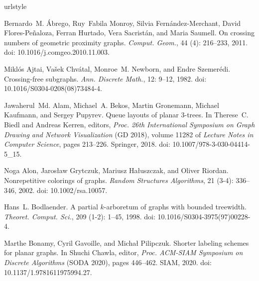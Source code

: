 \documentclass{patmorin}
\begin{document}
\begin{thebibliography}{37}
	\providecommand{\natexlab}[1]{#1}
	\providecommand{\url}[1]{\texttt{#1}}
	\expandafter\ifx\csname urlstyle\endcsname\relax
	\providecommand{\doi}[1]{doi: #1}\else
	\providecommand{\doi}{doi: \begingroup \urlstyle{rm}\Url}\fi
	
	Bernardo~M. {\'{A}}brego, Ruy~Fabila Monroy, Silvia Fern{\'{a}}ndez{-}Merchant,
	David Flores{-}Pe{\~{n}}aloza, Ferran Hurtado, Vera Sacrist{\'{a}}n, and
	Maria Saumell.
	\newblock On crossing numbers of geometric proximity graphs.
	\newblock \emph{Comput. Geom.}, 44 (4): 216--233, 2011.
	\newblock \doi{10.1016/j.comgeo.2010.11.003}.
	
	Mikl{\'o}s Ajtai, Va{\v{s}}ek Chv{\'a}tal, Monroe~M. Newborn, and Endre
	Szemer{\'e}di.
	\newblock Crossing-free subgraphs.
	\newblock \emph{Ann. Discrete Math.}, 12: 9--12, 1982.
	\newblock \doi{10.1016/S0304-0208(08)73484-4}.
	
	Jawaherul~Md. Alam, Michael~A. Bekos, Martin Gronemann, Michael Kaufmann, and
	Sergey Pupyrev.
	\newblock Queue layouts of planar 3-trees.
	\newblock In Therese~C. Biedl and Andreas Kerren, editors, \emph{Proc. 26th International Symposium on Graph Drawing and Network Visualization} (GD 2018), volume 11282 of \emph{Lecture Notes in Computer Science}, pages
	213--226. Springer, 2018.
	\newblock \doi{10.1007/978-3-030-04414-5\_15}.
	
	Noga Alon, {Jaros{\l}aw} Grytczuk, Mariusz Ha{\l}uszczak, and Oliver Riordan.
	\newblock Nonrepetitive colorings of graphs.
	\newblock \emph{Random Structures Algorithms}, 21 (3-4):
	336--346, 2002.
	\newblock \doi{10.1002/rsa.10057}.
	
	Hans~L. Bodlaender.
	\newblock A partial $k$-arboretum of graphs with bounded treewidth.
	\newblock \emph{Theoret. Comput. Sci.}, 209 (1-2): 1--45,
	1998.
	\newblock \doi{10.1016/S0304-3975(97)00228-4}.
	
	Marthe Bonamy, Cyril Gavoille, and Micha{\l} Pilipczuk.
	\newblock Shorter labeling schemes for planar graphs.
	\newblock In Shuchi Chawla, editor, \emph{Proc. ACM-SIAM Symposium on Discrete Algorithms} (SODA 2020), pages 446--462. {SIAM}, 2020.
	\newblock \doi{10.1137/1.9781611975994.27}.
	

\end{thebibliography}
\end{document}

